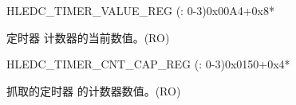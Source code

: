     \begin{register}{H}{LEDC\_TIMER\_VALUE\_REG (: 0-3)}{0x00A4+0x8*}\label{regdesc:LEDCTIMERNVALUEREG}
    \regnewline%
    \begin{regdesc}\begin{reglist}
    \label{fielddesc:LEDCTIMERNCNT}\item [LEDC\_TIMER\regindex{x}\_CNT] 定时器  计数器的当前数值。(RO)
    \end{reglist}\end{regdesc}
    \end{register}


    \begin{register}{H}{LEDC\_TIMER\_CNT\_CAP\_REG (: 0-3)}{0x0150+0x4*}\label{regdesc:LEDCTIMERNCNTCAPREG}
    \regnewline%
    \begin{regdesc}\begin{reglist}
    \label{fielddesc:LEDCTIMERNCNTCAP}\item [LEDC\_TIMER\regindex{x}\_CNT\_CAP] 抓取的定时器  的计数器数值。(RO)
    \end{reglist}\end{regdesc}
    \end{register}


